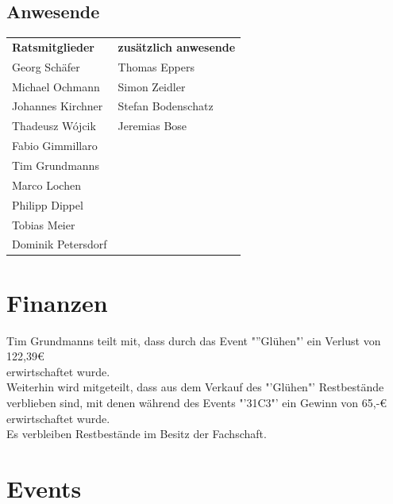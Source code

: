 \documentclass[a4paper, 11pt]{article} %
\begin{document}
\subsection{Anwesende}
\begin{tabular}{ll}
	\textbf{Ratsmitglieder} & \textbf{zusätzlich anwesende}\\
	Georg Schäfer & Thomas Eppers\\
	Michael Ochmann & Simon Zeidler\\
	Johannes Kirchner & Stefan Bodenschatz\\
	Thadeusz W{\'o}jcik & Jeremias Bose\\
	Fabio Gimmillaro\\
	Tim Grundmanns\\
	 Marco Lochen\\
	 Philipp Dippel\\
	Tobias Meier\\
	Dominik Petersdorf\\
\end{tabular}
\vspace{1.0cm}
\section{Finanzen}

Tim Grundmanns teilt mit, dass durch das Event "''Glühen"' ein Verlust von 122,39€
\\
erwirtschaftet wurde.
\\
Weiterhin wird mitgeteilt, dass aus dem Verkauf des "'Glühen"' Restbestände verblieben sind, mit denen während des Events "'31C3"' ein Gewinn von 65,-€ erwirtschaftet wurde.
\\
Es verbleiben Restbestände im Besitz der Fachschaft.

\section{Events}
\end{document}
